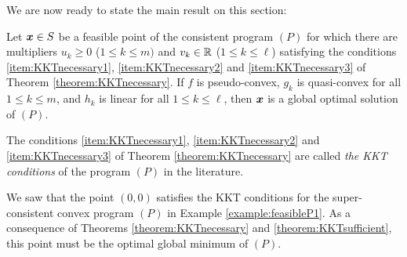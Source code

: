 We are now ready to state the main result on this section:

\begin{theorem}\label{theorem:KKTsufficient}
Let $\boldsymbol{x} \in S$ be a feasible point of the consistent program $(P)$ for which there are multipliers $u_k \geq 0$ ($1\leq k \leq m)$ and $v_k \in \mathbb{R}$ ($1\leq k \leq \ell$) satisfying the conditions \ref{item:KKTnecessary1}, \ref{item:KKTnecessary2} and \ref{item:KKTnecessary3} of Theorem \ref{theorem:KKTnecessary}. If $f$ is pseudo-convex, $g_k$ is quasi-convex for all $1\leq k \leq m$, and $h_k$ is linear for all $1\leq k \leq \ell$, then $\boldsymbol{x}$ is a global optimal solution of $(P)$.
\end{theorem}

\begin{remark}
The conditions \ref{item:KKTnecessary1}, \ref{item:KKTnecessary2} and \ref{item:KKTnecessary3} of Theorem \ref{theorem:KKTnecessary} are called \emph{the KKT conditions} of the program $(P)$ in the literature.
\end{remark}

\begin{example}
We saw that the point $(0,0)$ satisfies the KKT conditions for the super-consistent convex program $(P)$ in Example \ref{example:feasibleP1}.  As a consequence of Theorems \ref{theorem:KKTnecessary} and \ref{theorem:KKTsufficient}, this point must be the optimal global minimum of $(P)$.
\end{example}